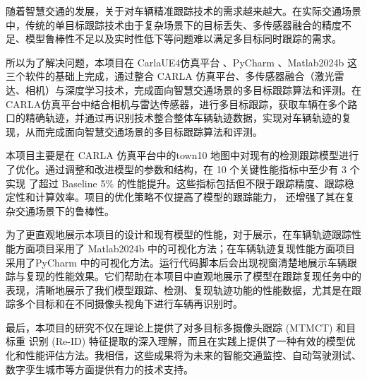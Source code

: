 \begin{abstractzh}

随着智慧交通的发展，关于对车辆精准跟踪技术的需求越来越大。在实际交通场景中，传统的单目标跟踪技术由于复杂场景下的目标丢失、多传感器融合的精度不足、模型鲁棒性不足以及实时性低下等问题难以满足多目标同时跟踪的需求。

所以为了解决问题，本项目在 CarlaUE4仿真平台 、PyCharm 、Matlab2024b 这三个软件的基础上完成，通过整合 CARLA 仿真平台、多传感器融合（激光雷达、相机）与深度学习技术，完成面向智慧交通场景的多目标跟踪算法和评测。在CARLA仿真平台中结合相机与雷达传感器，进行多目标跟踪，获取车辆在多个路口的精确轨迹，并通过再识别技术整合整体车辆轨迹数据，实现对车辆轨迹的复现，从而完成面向智慧交通场景的多目标跟踪算法和评测。

本项目主要是在 CARLA 仿真平台中的town10 地图中对现有的检测跟踪模型进行 了优化。通过调整和改进模型的参数和结构，在 10 个关键性能指标中至少有 3 个实现 了超过 Baseline 5\% 的性能提升。这些指标包括但不限于跟踪精度、跟踪稳定性和计算效率。项目的优化策略不仅提高了模型的跟踪能力， 还增强了其在复杂交通场景下的鲁棒性。

为了更直观地展示本项目的设计和现有模型的性能，对于展示，在车辆轨迹跟踪性能方面项目采用了 Matlab2024b 中的可视化方法；在车辆轨迹复现性能方面项目采用了PyCharm 中的可视化方法。运行代码脚本后会出现视窗清楚地展示车辆跟踪与复现的性能效果。它们帮助在本项目中直观地展示了模型在跟踪复现任务中的表现，清晰地展示了我们模型跟踪、检测、复现轨迹功能的性能数据，尤其是在跟踪多个目标和在不同摄像头视角下进行车辆再识别时。

最后，本项目的研究不仅在理论上提供了对多目标多摄像头跟踪 (MTMCT) 和目标重 识别 (Re-ID) 特征提取的深入理解，而且在实践上提供了一种有效的模型优化和性能评估方法。我相信，这些成果将为未来的智能交通监控、自动驾驶测试、数字孪生城市等方面提供有力的技术支持。


\end{abstractzh}
